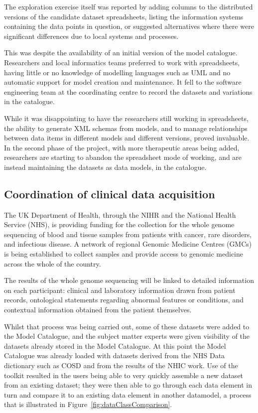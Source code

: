 The exploration exercise itself was reported by adding columns to the
distributed versions of the candidate dataset spreadsheets, listing
the information systems containing the data points in question, or
suggested alternatives where there were significant differences due to
local systems and processes.

This was despite the availability of an initial version of the model
catalogue.  Researchers and local informatics teams preferred to work
with spreadsheets, having little or no knowledge of modelling
languages such as UML and no automatic support for model creation and
maintenance.  It fell to the software engineering team at the
coordinating centre to record the datasets and variations in the
catalogue.

While it was disappointing to have the researchers still working in
spreadsheets, the ability to generate XML schemas from models, and to
manage relationships between data items in different models and
different versions, proved invaluable.  In the second phase of the
project, with more therapeutic areas being added, researchers are
starting to abandon the spreadsheet mode of working, and are instead
maintaining the datasets as data models, in the catalogue.

\subsection{Coordination of clinical data acquisition}

The UK Department of Health, through the NIHR and the National Health
Service (NHS), is providing funding for the collection for the whole
genome sequencing of blood and tissue samples from patients with
cancer, rare disorders, and infectious disease.  A network of regional
Genomic Medicine Centres (GMCs) is being established to collect
samples and provide access to genomic medicine across the whole of the
country.

The results of the whole genome sequencing will be linked to detailed
information on each participant: clinical and laboratory information
drawn from patient records, ontological statements regarding abnormal
features or conditions, and contextual information obtained from the
patient themselves.



Whilst that process was being carried out, some of these datasets were
added to the Model Catalogue, and the subject matter experts were
given visibility of the datasets already stored in the Model
Catalogue. At this point the Model Catalogue was already loaded with
datasets derived from the NHS Data dictionary such as COSD and from
the results of the NHIC work. Use of the toolkit resulted in the users
being able to very quickly assemble a new dataset from an existing
dataset; they were then able to go through each data element in turn
and compare it to an existing data element in another datamodel, a
process that is illustrated in Figure~\ref{fig:dataClassComparison}.

